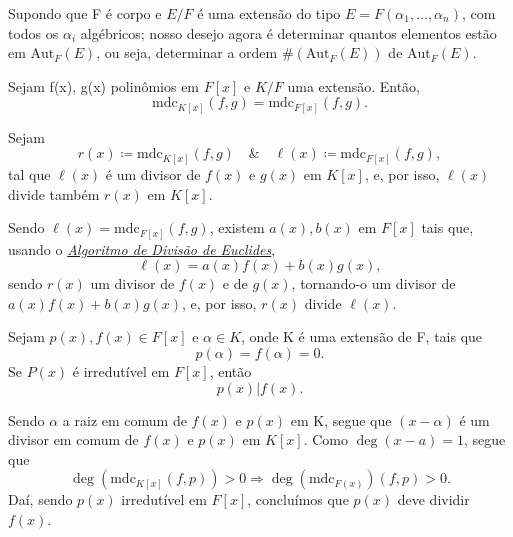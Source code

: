 \documentclass[../algebraIII_notes.tex]{subfiles}
\begin{document}
Supondo que F é corpo e \(E/F\) é uma extensão do tipo \(E = F(\alpha_{1}, \dotsc , \alpha_{n})\), com todos os \(\alpha_{i}\) algébricos; nosso desejo agora é determinar quantos elementos estão em \(\mathrm{Aut}_{F}(E)\), ou seja, determinar a ordem \(\#(\mathrm{Aut}_{F}(E))\) de \(\mathrm{Aut}_{F}(E)\).
\begin{lemma*}
	Sejam f(x), g(x) polinômios em \(F[x]\) e \(K/F\) uma extensão. Então,
	\[
		\mathrm{mdc}_{K[x]}(f, g) = \mathrm{mdc}_{F[x]}(f, g).
	\]
\end{lemma*}
\begin{proof*}
	Sejam
	\[
		r(x)\coloneqq \mathrm{mdc}_{K[x]}(f, g) \quad\&\quad \ell (x) \coloneqq \mathrm{mdc}_{F[x]}(f, g),
	\]
	tal que \(\ell (x)\) é um divisor de \(f(x)\) e \(g(x)\) em \(K[x]\), e, por isso, \(\ell (x)\) divide também \(r(x)\) em \(K[x]\).

	Sendo \(\ell (x) = \mathrm{mdc}_{F[x]}(f, g)\), existem \(a(x), b(x)\) em \(F[x]\) tais que, usando o \hyperlink{euclides_algorithm}{\textit{Algoritmo de Divisão de Euclides}},
	\[
		\ell (x) = a(x)f(x) + b(x)g(x),
	\]
	sendo \(r(x)\) um divisor de \(f(x)\) e de \(g(x)\), tornando-o um divisor de \(a(x)f(x)+b(x)g(x)\), e, por isso, \(r(x)\) divide \(\ell (x)\). \qedsymbol
\end{proof*}
\begin{crl*}
	Sejam \(p(x), f(x)\in F[x]\) e \(\alpha \in K\), onde K é uma extensão de F, tais que
	\[
		p(\alpha ) = f(\alpha ) = 0.
	\]
	Se \(P(x)\) é irredutível em \(F[x]\), então
	\[
		p(x)| f(x).
	\]
\end{crl*}
\begin{proof*}
	Sendo \(\alpha \) a raiz em comum de \(f(x)\) e \(p(x)\) em K, segue que \((x-\alpha )\) é um divisor em comum de \(f(x)\) e \(p(x)\) em \(K[x]\). Como \(\deg{(x-a)}=1\), segue que
	\[
		\deg{(\mathrm{mdc}_{K[x]}(f, p))}>0 \Rightarrow \deg{(\mathrm{mdc}_{F(x)})(f, p)} > 0.
	\]
	Daí, sendo \(p(x)\) irredutível em \(F[x]\), concluímos que \(p(x)\) deve dividir \(f(x)\). \qedsymbol

\end{proof*}
\end{document}
